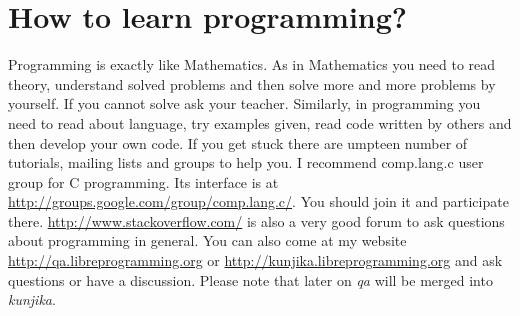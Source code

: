 \section{How to learn programming?}
Programming is exactly like Mathematics. As in Mathematics you need to read
theory, understand solved problems and then solve more and more problems by
yourself. If you cannot solve ask your teacher. Similarly, in programming you
need to read about language, try examples given, read code written by others
and then develop your own code. If you get stuck there are umpteen number of
tutorials, mailing lists and groups to help you. I recommend comp.lang.c user
group for C programming. Its interface is at
\url{http://groups.google.com/group/comp.lang.c/}. You should join it and
participate there. \url{http://www.stackoverflow.com/} is also a very good
forum to ask questions about programming in general. You can also come at my
website \url{http://qa.libreprogramming.org} or
\url{http://kunjika.libreprogramming.org} and ask questions or have a
discussion. Please note that later on \textit{qa} will be merged into
\textit{kunjika}.

